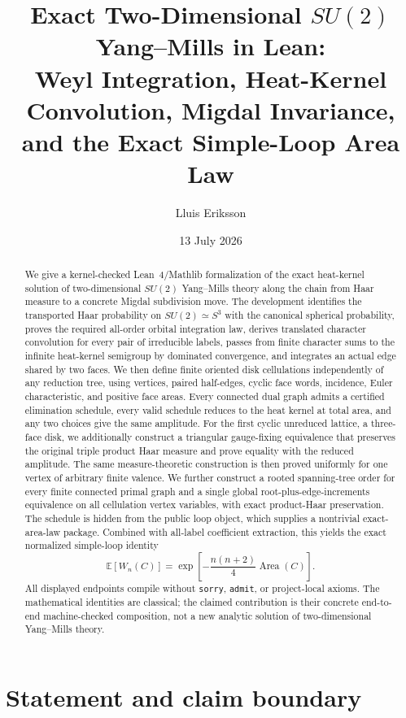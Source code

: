 \documentclass[11pt,a4paper]{article}
\title{\bfseries Exact Two-Dimensional $SU(2)$ Yang--Mills in Lean:\\
Weyl Integration, Heat-Kernel Convolution, Migdal Invariance,\\
and the Exact Simple-Loop Area Law}
\author{Lluis Eriksson}
\date{13 July 2026}
\theoremstyle{remark}
\begin{document}
\maketitle

\begin{abstract}
We give a kernel-checked Lean~4/Mathlib formalization of the exact
heat-kernel solution of two-dimensional $SU(2)$ Yang--Mills theory along the
chain from Haar measure to a concrete Migdal subdivision move.  The development
identifies the transported Haar probability on $SU(2)\simeq S^3$ with the
canonical spherical probability, proves the required all-order orbital
integration law, derives translated character convolution for every pair of
irreducible labels, passes from finite character sums to the infinite
heat-kernel semigroup by dominated convergence, and integrates an actual edge
shared by two faces.  We then define finite oriented disk cellulations
independently of any reduction tree, using vertices, paired half-edges, cyclic
face words, incidence, Euler characteristic, and positive face areas.  Every
connected dual graph admits a certified elimination schedule, every valid
schedule reduces to the heat kernel at total area, and any two choices give
the same amplitude.  For the first cyclic unreduced lattice, a three-face disk,
we additionally construct a triangular gauge-fixing equivalence that preserves
the original triple product Haar measure and prove equality with the reduced
amplitude.  The same measure-theoretic construction is then proved uniformly
for one vertex of arbitrary finite valence.  We further construct a rooted
spanning-tree order for every finite connected primal graph and a single
global root-plus-edge-increments equivalence on all cellulation vertex
variables, with exact product-Haar preservation.  The schedule is hidden from the public loop object,
which supplies a nontrivial exact-area-law package.  Combined with all-label
coefficient extraction, this yields the exact normalized simple-loop identity
\[
  \mathbb E[W_n(C)]
  =\exp\!\left[-\frac{n(n+2)}4\operatorname{Area}(C)\right].
\]
All displayed endpoints compile without \texttt{sorry}, \texttt{admit}, or
project-local axioms.  The mathematical identities are classical; the claimed
contribution is their concrete end-to-end machine-checked composition, not a
new analytic solution of two-dimensional Yang--Mills theory.
\end{abstract}

\section{Statement and claim boundary}
\end{document}
